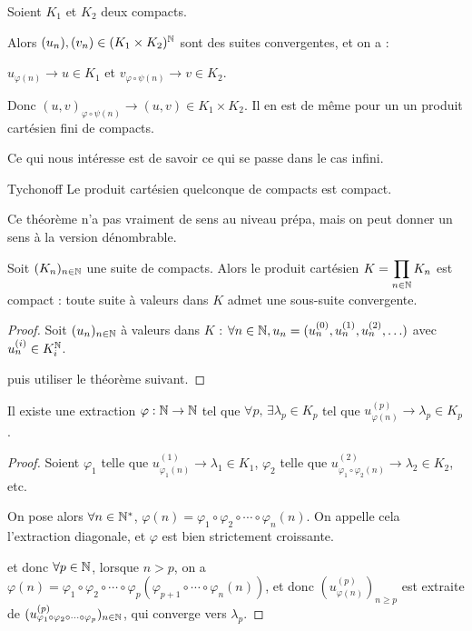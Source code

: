 Soient $K_1$ et $K_2$ deux compacts. 

Alors $(u_n), (v_n) \in (K_1 \times K_2)^{\mathbb{N}}$ sont des suites convergentes, et on a : 

$u_{\varphi(n)} \to u \in K_1$ et $v_{\varphi\circ \psi(n)} \to v \in K_2$.

Donc $(u, v)_{\varphi \circ \psi(n)} \to (u, v) \in K_1 \times K_2$. Il en est de même pour un un produit cartésien fini de compacts.

\lvspace Ce qui nous intéresse est de savoir ce qui se passe dans le cas infini.

\begin{theoreme}{Tychonoff}{}
    Le produit cartésien quelconque de compacts est compact.
\end{theoreme}

Ce théorème n'a pas vraiment de sens au niveau prépa, mais on peut donner un sens à la version dénombrable.

\begin{theoreme}{}{}
    Soit $(K_n)_{n \in \mathbb{N}}$ une suite de compacts. Alors le produit cartésien $\displaystyle K = \prod_{n \in \mathbb{N}} K_n$ est compact : 
    toute suite à valeurs dans $K$ admet une sous-suite convergente.
\end{theoreme}

\begin{proof}
    Soit $(u_n)_{n \in \mathbb{N}}$ à valeurs dans $K$ : $\forall n \in \mathbb{N}, u_n = (u_n^{(0)}, u_n^{(1)}, u_n^{(2)}, \ldots)$ avec $u_n^{(i)} \in K_i^{\mathbb{N}}$.

    puis utiliser le théorème suivant.
\end{proof}

\begin{theoreme}{}{}
    Il existe une extraction $\varphi : \mathbb{N} \to \mathbb{N}$ tel que $\forall p , \, \exists \lambda_p \in K_p$ tel que $u_{\varphi(n)}^{(p)} \to \lambda_p \in K_p$.
\end{theoreme}

\begin{proof}
    Soient $\varphi_1$ telle que $u_{\varphi_1(n)}^{(1)} \to \lambda_1 \in K_1$, $\varphi_2$ telle que $u_{\varphi_1 \circ \varphi_2(n)}^{(2)} \to \lambda_2 \in K_2$, etc.

    On pose alors $\forall n \in \mathbb{N}^*$, $\varphi(n) = \varphi_1 \circ \varphi_2 \circ \cdots \circ \varphi_n(n)$.
    On appelle cela l'extraction diagonale, et $\varphi$ est bien strictement croissante.

    et donc $\forall p \in \mathbb{N}$, lorsque $n > p$, on a $\varphi(n) = \varphi_1 \circ \varphi_2 \circ \cdots \circ \varphi_p (\varphi_{p+1} \circ \cdots \circ \varphi_n(n))$, 
    et donc $(u_{\varphi(n)}^{(p)})_{n \geqslant p}$ est extraite de $(u_{\varphi_1 \circ \varphi_2 \circ \cdots \circ \varphi_p }^{(p)})_{n \in \mathbb{N}}$, qui converge vers $\lambda_p$.

\end{proof}

